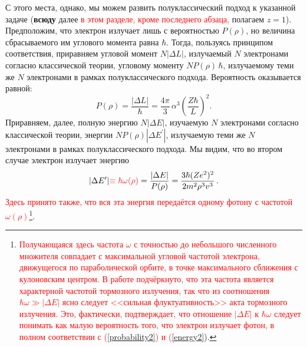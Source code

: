 \documentclass{SovJurn/JETPL}
\begin{document}
С этого места, однако, мы можем развить полуклассический подход к указанной задаче (\textbf{всюду} далее \textcolor{Red}{в этом разделе, кроме последнего абзаца,} полагаем $z=1$). Предположим, что электрон излучает лишь с вероятностью $P(\rho)$, но величина сбрасываемого им углового момента равна $\hbar$. Тогда, пользуясь принципом соответствия, приравняем угловой момент $N|\Delta L|$, излучаемый $N$ электронами согласно классической теории, угловому моменту $NP(\rho)\,\hbar$, излучаемому теми же $N$ электронами в рамках полуклассического подхода. Вероятность оказывается равной: 
\begin{equation}
P(\rho)=\frac{|\Delta L|}{\hbar}=
\frac{4\pi}{3}\,\alpha^3 \left(\frac{Z\hbar}{L}\right)^2.
\label{probability2}
\end{equation}
Приравняем, далее, полную энергию $N|\Delta E|$, изучаемую $N$ электронами согласно классической теории, энергии $NP(\rho)|\Delta E^{\prime}|$, излучаемую теми же $N$ электронами в рамках полуклассического подхода.%
Мы видим, что во втором случае электрон излучает энергию
\begin{equation}
|\Delta E^{\prime}|
\textcolor{Red}{\equiv\hbar\omega(\rho)}=
\frac{|\Delta E|}{P(\rho)}=
\frac{3\hbar (Ze^2)^2}{2m^2\rho^3v^3}\,.
\label{energy2}
\end{equation}
\textcolor{Red}{Здесь принято также, что вся эта энергия передаётся одному фотону с частотой $\omega(\rho)$}\footnote{\textcolor{Red}{Получающаяся здесь частота $\omega$ с точностью до небольшого численного множителя совпадает с максимальной угловой частотой электрона, движущегося по параболической орбите, в точке максимального сближения с кулоновским центром. В работе \cite{KoganPlanckConstant} подчёркнуто, что эта частота является характерной частотой тормозного излучения, так что из соотношения $\hbar\omega \gg |\Delta E|$ ясно следует <<сильная флуктуативность>> акта тормозного излучения. Это, фактически, подтверждает, что отношение $|\Delta E|$ к $\hbar\omega$ следует понимать как малую вероятность того, что электрон излучает фотон, в полном соответствии с (\ref{probability2}) и (\ref{energy2}}).}.
\end{document}
